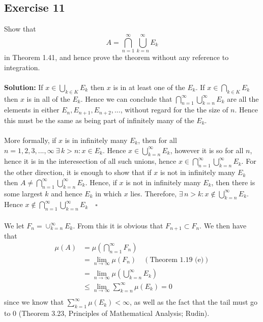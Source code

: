 \documentclass{article}
\begin{document}
\subsection*{Exercise 11}
Show that
\[ A = \bigcap_{n=1}^{\infty}\bigcup_{k=n}^{\infty} E_k\]
in Theorem 1.41, and hence prove the theorem without any reference to integration.
\\\\
\textbf{Solution:}
If $x \in \bigcup_{k \in K} E_k$ then $x$ is in at least one of the $E_k$. If $x \in \bigcap_{k \in K} E_k$ then $x$ is in all of the $E_k$.
Hence we can conclude that $\bigcap_{n=1}^{\infty}\bigcup_{k=n}^{\infty} E_k$ are all the elements in either $E_n, E_{n+1}, E_{n+2}, ...$, without regard for the
the size of $n$. Hence this must be the same as being part of infinitely many of the $E_k$.
\\\\
More formally, if $x$ is in infinitely many $E_k$, then for all $n=1,2,3,..., \infty \  \exists \, k> n: x\in E_k$.
Hence $x \in \bigcup_{k=n}^{\infty} E_k$, however it is so for all $n$, hence it is in the interesection of all such unions,
hence $x \in \bigcap_{n=1}^{\infty}\bigcup_{k=n}^{\infty} E_k$. For the other direction, it is enough to show that if $x$ is not in
infinitely many $E_k$ then $A \neq \bigcap_{n=1}^{\infty}\bigcup_{k=n}^{\infty} E_k$. Hence, if $x$ is not in infinitely many $E_k$, 
then there is some largest $k$ and hence $E_k$ in which $x$ lies.
Therefore, $\exists \, n>k: x\notin \bigcup_{k=n}^{\infty} E_k$. Hence $x \notin \bigcap_{n=1}^{\infty}\bigcup_{k=n}^{\infty} E_k \quad \square$
\\\\
We let $F_n = \cup_{k=n}^{\infty} E_k$. From this it is obvious that $F_{n+1} \subset F_n$. 
We then have that 
\begin{equation*}
    \begin{aligned}
        \mu(A) &= \mu(\bigcap_{n=1}^{\infty}F_n)\\
        &= \lim_{n\to\infty} \mu(F_n) \quad (\text{Theorem 1.19 (e)})\\
        &= \lim_{n\to\infty} \mu(\bigcup_{k=n}^{\infty}E_k)\\
        &\le \lim_{n\to\infty} \sum_{k=n}^{\infty} \mu(E_k) = 0\\
    \end{aligned}
\end{equation*}
since we know that $\sum_{k=1}^{\infty}\mu(E_k) < \infty$, as well as the fact that the tail must go to 0 (Theorem 3.23, Principles of Mathematical Analysis; Rudin).
\end{document}
